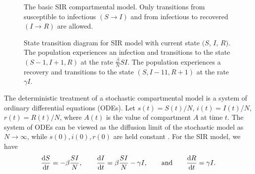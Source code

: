 \begin{figure}
    \centering
    \caption[The basic SIR compartmental model.]{The basic SIR compartmental model.
    Only transitions from susceptible to infectious \( (S \to I) \) and from infectious to recovered \( (I \to R) \) are allowed.}
    \label{ch_2:fig:SIR_diagram}
\end{figure}

\begin{figure}
    \centering
    \caption[State transition diagram for SIR model.]{State transition diagram for SIR model with current state \( (S \), \( I \),  \( R) \).
    The population experiences an infection and transitions to the state \( (S-1, I+1, R) \) at the rate \( \frac{\beta}{N}SI \).
    The population experiences a recovery and transitions to the state \( (S, I-11, R+1) \) at the rate \( \gamma I \).
    }
    \label{ch_2:fig:stocastic_SIR}
\end{figure}

The deterministic treatment of a stochastic compartmental model is a system of ordinary differential equations (ODEs).
Let \( s(t) = S(t) / N \), \( i(t) = I(t) / N \), \( r(t) = R(t) / N \), where \( A(t) \) is the value of compartment \( A \) at time \( t \).
The system of ODEs can be viewed as the diffusion limit of the stochastic model as \( N \to \infty \), while \( s(0), i(0), r(0) \) are held constant \citep{Greenwood2009, fuchs2013inference}.
For the SIR model, we have 
\begin{equation}
    \frac{\mathrm{d} S}{\mathrm{d} t} = -\beta \frac{SI}{N}, \qquad
    \frac{\mathrm{d} I}{\mathrm{d} t} = \beta \frac{SI}{N} - \gamma I, \qquad
    \text{and} \qquad
    \frac{\mathrm{d} R}{\mathrm{d} t} = \gamma I
    \text{.}
\label{ch_2:SIR_diff_eq}
\end{equation}

